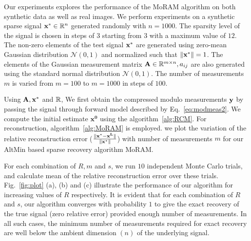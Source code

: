 Our experiments explores the performance of the MoRAM algorithm on both synthetic data as well as real images. We perform experiments on a synthetic sparse signal $\mathbf{x^*} \in {\mathbb{R}}^n$ generated randomly with $n=1000$. The sparsity level of the signal is chosen in steps of $3$ starting from $3$ with a maximum value of $12$. The non-zero elements of the test signal $\mathbf{x^*}$ are generated using zero-mean Gaussian distribution $\mathcal{N}(0, 1)$ and normalized such that $\|\mathbf{x^*}\| =1$. The elements of the Gaussian measurement matrix $\mathbf{A} \in {\mathbb{R}}^{m\times n}, a_{ij}$ are also generated using the standard normal distribution $\mathcal{N}(0, 1)$. The number of measurements $m$ is varied from $m = 100$ to $m=1000$ in steps of $100$. 


Using $\mathbf{A, x^*}$ and ${\mathbb{R}}$, We first obtain the compressed modulo measurements $\mathbf{y}$ by passing the signal through forward model described by Eq.~\ref{eq:modmeas2}. We compute the initial estimate $\mathbf{x^0}$ using the algorithm~\ref{alg:RCM}. For reconstruction, algorithm~\ref{alg:MoRAM} is employed. we plot the variation of the relative reconstruction error ($\frac{\|\mathbf{x^*-x^L}\|}{\|\mathbf{x^*}\|}$) with number of measurements $m$ for our AltMin based sparse recovery algorithm MoRAM.

For each combination of $R, m$ and $s$, we run $10$ independent Monte Carlo trials, and calculate mean of the relative reconstruction error over these trials. Fig.~\ref{fig:plot} (a), (b) and (c) illustrate the performance of our algorithm for increasing values of $R$ respectively. It is evident that for each combination of $R$ and $s$, our algorithm converges with probability $1$ to give the exact recovery of the true signal (zero relative error) provided enough number of measurements. In all such cases, the minimum number of measurements required for exact recovery are well below the ambient dimension $(n)$ of the underlying signal. 

